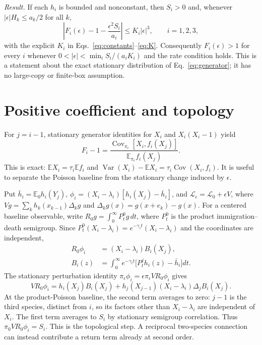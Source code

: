 \documentclass[aps,pre,twocolumn,showpacs,amsmath,amssymb]{revtex4-2}
\begin{document}
\textit{Result.} If each $h_i$ is bounded and nonconstant, then $S_i>0$ and, whenever $|\epsilon|H_k\leq a_k/2$ for all $k$,
\begin{equation}
\left|F_i(\epsilon)-1-\frac{\epsilon^2 S_i}{a_i}\right|\leq K_i|\epsilon|^3,\qquad i=1,2,3,\label{eq:bound}
\end{equation}
with the explicit $K_i$ in Eqs.~\eqref{eq:constants}--\eqref{eq:K}. Consequently $F_i(\epsilon)>1$ for every $i$ whenever $0<|\epsilon|<\min_i S_i/(a_iK_i)$ and the rate condition holds. This is a statement about the exact stationary distribution of Eq.~\eqref{eq:generator}; it has no large-copy or finite-box assumption.

\section{Positive coefficient and topology}
For $j=i-1$, stationary generator identities for $X_i$ and $X_i(X_i-1)$ yield
\begin{equation}
F_i-1=\frac{\operatorname{Cov}_{\pi_\epsilon}[X_i,f_i(X_j)]}
{\mathbb E_{\pi_\epsilon}f_i(X_j)}.
\label{eq:moment}
\end{equation}
This is exact: $\mathbb E X_i=\tau_i\mathbb E f_i$ and $\operatorname{Var}(X_i)-\mathbb E X_i=\tau_i\operatorname{Cov}(X_i,f_i)$. It is useful to separate the Poisson baseline from the stationary change induced by $\epsilon$.

Put $\bar h_i=\mathbb E_0h_i(Y_j)$, $\phi_i=(X_i-\lambda_i)[h_i(X_j)-\bar h_i]$, and $\mathcal L_\epsilon=\mathcal L_0+\epsilon V$, where $Vg=\sum_k h_k(x_{k-1})\Delta_k g$ and $\Delta_k g(x)=g(x+e_k)-g(x)$. For a centered baseline observable, write $R_0g=\int_0^\infty P_t^0g\,dt$, where $P_t^0$ is the product immigration--death semigroup. Since $P_t^0(X_i-\lambda_i)=e^{-\gamma_i t}(X_i-\lambda_i)$ and the coordinates are independent,
\begin{align}
R_0\phi_i&=(X_i-\lambda_i)B_i(X_j),\nonumber\\
B_i(z)&=\int_0^\infty e^{-\gamma_i t}
\bigl[P_t^jh_i(z)-\bar h_i\bigr]dt .
\label{eq:firstR}
\end{align}
The stationary perturbation identity $\pi_\epsilon\phi_i=\epsilon\pi_\epsilon VR_0\phi_i$ gives
\begin{equation}
VR_0\phi_i=h_i(X_j)B_i(X_j)
+h_j(X_{j-1})(X_i-\lambda_i)\Delta_jB_i(X_j).
\label{eq:firstV}
\end{equation}
At the product-Poisson baseline, the second term averages to zero: $j-1$ is the third species, distinct from $i$, so its factors other than $X_i-\lambda_i$ are independent of $X_i$. The first term averages to $S_i$ by stationary semigroup correlation. Thus $\pi_0VR_0\phi_i=S_i$. This is the topological step. A reciprocal two-species connection can instead contribute a return term already at second order.
\end{document}
